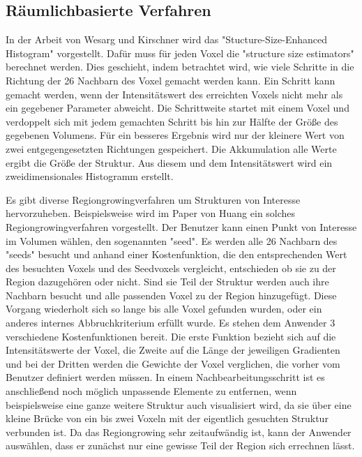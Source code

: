 \subsection{Räumlichbasierte Verfahren}


In der Arbeit von Wesarg und Kirschner \cite{wesarg2009structure, wesarg20102d} wird das "Stucture-Size-Enhanced Histogram" vorgestellt.
\newline
Dafür muss für jeden Voxel die "structure size estimators" berechnet werden. Dies geschieht, indem betrachtet wird, wie viele Schritte in die Richtung der 26 Nachbarn des Voxel gemacht werden kann. Ein Schritt kann gemacht werden, wenn der Intensitätswert des erreichten Voxels nicht mehr als ein gegebener Parameter abweicht. Die Schrittweite startet mit einem Voxel und verdoppelt sich mit jedem gemachten Schritt bis hin zur Hälfte der Größe des gegebenen Volumens. Für ein besseres Ergebnis wird nur der kleinere Wert von zwei entgegengesetzten Richtungen gespeichert. Die Akkumulation alle Werte ergibt die Größe der Struktur. Aus diesem und dem Intensitätswert wird ein zweidimensionales Histogramm erstellt.


Es gibt diverse Regiongrowingverfahren um Strukturen von Interesse hervorzuheben.
\newline
Beispielsweise wird im Paper von Huang \cite{huang2003rgvis} ein solches Regiongrowingverfahren vorgestellt.
\newline
Der Benutzer kann einen Punkt von Interesse im Volumen wählen, den sogenannten "seed". Es werden alle 26 Nachbarn des "seeds" besucht und anhand einer Kostenfunktion, die den entsprechenden Wert des besuchten Voxels und des Seedvoxels vergleicht, entschieden ob sie zu der Region dazugehören oder nicht. Sind sie Teil der Struktur werden auch ihre Nachbarn besucht und alle passenden Voxel zu der Region hinzugefügt. Diese Vorgang wiederholt sich so lange bis alle Voxel gefunden wurden, oder ein anderes internes Abbruchkriterium erfüllt wurde.  Es stehen dem Anwender 3 verschiedene Kostenfunktionen bereit. Die erste Funktion bezieht sich auf die Intensitätswerte der Voxel, die Zweite auf die Länge der jeweiligen Gradienten und bei der Dritten werden die Gewichte der Voxel verglichen, die vorher vom Benutzer definiert werden müssen. In einem Nachbearbeitungsschritt ist es anschließend noch möglich unpassende Elemente zu entfernen, wenn beispielsweise eine ganze weitere Struktur auch visualisiert wird, da sie über eine kleine Brücke von ein bis zwei Voxeln mit der eigentlich gesuchten Struktur verbunden ist.
\newline
Da das Regiongrowing sehr zeitaufwändig ist, kann der Anwender auswählen, dass er zunächst nur eine gewisse Teil der Region sich errechnen lässt.


